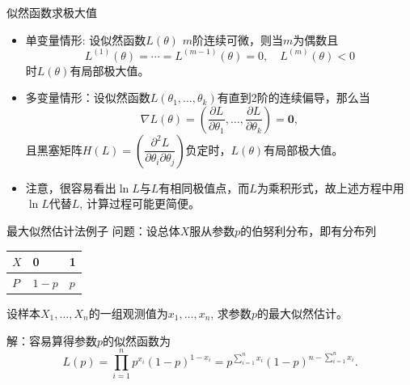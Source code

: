 \begin{frame}

\begin{block}{似然函数求极大值}
\begin{itemize}
\item 单变量情形: 设似然函数$L(\theta)$ $m$阶连续可微，则当$m$为偶数且
\[L^{(1)}(\theta) = \cdots = L^{(m-1)}(\theta) = 0, \quad L^{(m)}(\theta) < 0\]
时$L(\theta)$有局部极大值。
\item 多变量情形：设似然函数$L(\theta_1,\ldots,\theta_k)$有直到2阶的连续偏导，那么当
\[\nabla L(\theta) = \left( \dfrac{\partial L}{\partial \theta_1}, \ldots, \dfrac{\partial L}{\partial \theta_k} \right) = \mathbf{0},\]
且黑塞矩阵$H(L) = \left( \dfrac{\partial^2 L}{\partial \theta_i \partial \theta_j} \right)$负定时，$L(\theta)$有局部极大值。
\item 注意，很容易看出$\ln L$与$L$有相同极值点，而$L$为乘积形式，故上述方程中用$\ln L$代替$L$, 计算过程可能更简便。
\end{itemize}
\end{block}

\end{frame}


\begin{frame}

\begin{block}{最大似然估计法例子}
问题：设总体$X$服从参数$p$的伯努利分布，即有分布列
\begin{center}
\renewcommand{\arraystretch}{1.3}
\begin{tabu} to 0.5\textwidth { X[c] | X[c] | X[c] }
\hline
$X$ & 0 & 1 \\
\hline
$P$ & $1-p$ & $p$ \\
\hline
\end{tabu}
\renewcommand{\arraystretch}{1}
\end{center}
设样本$X_1,\ldots,X_n$的一组观测值为$x_1,\ldots,x_n$, 求参数$p$的最大似然估计。

\vspace{1em}
\pause

解：容易算得参数$p$的似然函数为
\[L(p) = \prod\limits_{i=1}^n p^{x_i}(1-p)^{1-x_i} = p^{\sum\limits_{i=1}^n x_i} (1-p)^{n - \sum\limits_{i=1}^n x_i}.\]
\end{block}

\end{frame}


